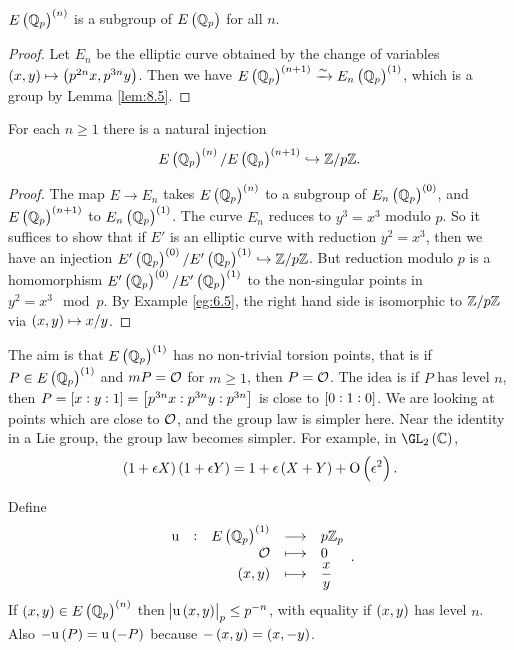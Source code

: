 \begin{corollary}
$ E\br{\QQ_p}^{\br{n}} $ is a subgroup of $ E\br{\QQ_p} $ for all $ n $.
\end{corollary}

\begin{proof}
Let $ E_n $ be the elliptic curve obtained by the change of variables $ \br{x, y} \mapsto \br{p^{2n}x, p^{3n}y} $. Then we have $ E\br{\QQ_p}^{\br{n + 1}} \xrightarrow{\sim} E_n\br{\QQ_p}^{\br{1}} $, which is a group by Lemma \ref{lem:8.5}.
\end{proof}

\begin{corollary}
For each $ n \ge 1 $ there is a natural injection
$$ E\br{\QQ_p}^{\br{n}} / E\br{\QQ_p}^{\br{n + 1}} \hookrightarrow \ZZ / p\ZZ. $$
\end{corollary}

\begin{proof}
The map $ E \to E_n $ takes $ E\br{\QQ_p}^{\br{n}} $ to a subgroup of $ E_n\br{\QQ_p}^{\br{0}} $, and $ E\br{\QQ_p}^{\br{n + 1}} $ to $ E_n\br{\QQ_p}^{\br{1}} $. The curve $ E_n $ reduces to $ y^3 = x^3 $ modulo $ p $. So it suffices to show that if $ E' $ is an elliptic curve with reduction $ y^2 = x^3 $, then we have an injection $ E'\br{\QQ_p}^{\br{0}} / E'\br{\QQ_p}^{\br{1}} \hookrightarrow \ZZ / p\ZZ $. But reduction modulo $ p $ is a homomorphism $ E'\br{\QQ_p}^{\br{0}} / E'\br{\QQ_p}^{\br{1}} $ to the non-singular points in $ y^2 = x^3 \mod p $. By Example \ref{eg:6.5}, the right hand side is isomorphic to $ \mathbb{Z} / p\mathbb{Z} $ via $ \br{x, y} \mapsto x / y $.
\end{proof}


\begin{remark}
The aim is that $ E\br{\QQ_p}^{\br{1}} $ has no non-trivial torsion points, that is if $ P \in E\br{\QQ_p}^{\br{1}} $ and $ mP = \mathcal{O} $ for $ m \ge 1 $, then $ P = \mathcal{O} $. The idea is if $ P $ has level $ n $, then $ P = \sbr{x : y : 1} = \sbr{p^{3n}x : p^{3n}y : p^{3n}} $ is close to $ \sbr{0 : 1 : 0} $. We are looking at points which are close to $ \mathcal{O} $, and the group law is simpler here. Near the identity in a Lie group, the group law becomes simpler. For example, in $ \GL_2\br{\CC} $,
$$ \br{1 + \epsilon X}\br{1 + \epsilon Y} = 1 + \epsilon\br{X + Y} + \O\br{\epsilon^2}. $$
\end{remark}

Define
$$
\begin{array}{ccrcl}
\u & : & E\br{\QQ_p}^{\br{1}} & \longrightarrow & p\ZZ_p \\
& & \OOO & \longmapsto & 0 \\
& & \br{x, y} & \longmapsto & \dfrac{x}{y}
\end{array}.
$$
If $ \br{x, y} \in E\br{\QQ_p}^{\br{n}} $ then $ \abs{\u\br{x, y}}_p \le p^{-n} $, with equality if $ \br{x, y} $ has level $ n $. Also $ -\u\br{P} = \u\br{-P} $ because $ -\br{x, y} = \br{x, -y} $.

